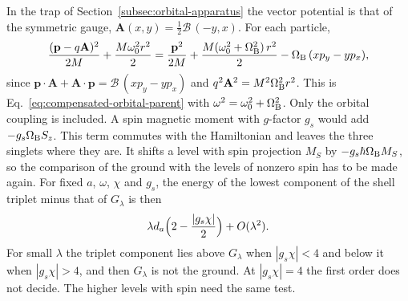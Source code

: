 In the trap of Section~\ref{subsec:orbital-apparatus} the vector potential is that of the symmetric gauge, $\mathbf A(x,y)=\tfrac12\mathcal B\,(-y,x)$. For each particle,
\begin{equation}
 \frac{(\mathbf p-q\mathbf A)^2}{2M}+\frac{M\omega_0^2r^2}{2}
 =\frac{\mathbf p^2}{2M}+\frac{M(\omega_0^2+\Omega_{\rm B}^2)\,r^2}{2}-\Omega_{\rm B}\,(xp_y-yp_x),
 \label{eq:pair-currents-minimal-coupling}
\end{equation}
since $\mathbf p\cdot\mathbf A+\mathbf A\cdot\mathbf p=\mathcal B\,(xp_y-yp_x)$ and $q^2\mathbf A^2=M^2\Omega_{\rm B}^2r^2$. This is Eq.~\eqref{eq:compensated-orbital-parent} with $\omega^2=\omega_0^2+\Omega_{\rm B}^2$. Only the orbital coupling is included. A spin magnetic moment with $g$-factor $g_s$ would add $-g_s\Omega_{\rm B}S_z$. This term commutes with the Hamiltonian and leaves the three singlets where they are. It shifts a level with spin projection $M_S$ by $-g_s\hbar\Omega_{\rm B}M_S$, so the comparison of the ground with the levels of nonzero spin has to be made again. For fixed $a$, $\omega$, $\chi$ and $g_s$, the energy of the lowest component of the shell triplet minus that of $G_\lambda$ is then
\begin{equation}
 \lambda d_a\Bigl(2-\frac{|g_s\chi|}{2}\Bigr)+O(\lambda^2).
 \label{eq:pair-currents-spin-gap}
\end{equation}
For small $\lambda$ the triplet component lies above $G_\lambda$ when $|g_s\chi|<4$ and below it when $|g_s\chi|>4$, and then $G_\lambda$ is not the ground. At $|g_s\chi|=4$ the first order does not decide. The higher levels with spin need the same test.

